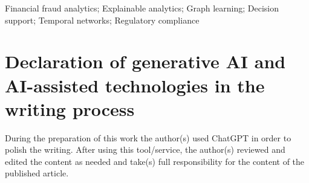 \documentclass[preprint,12pt,authoryear]{elsarticle}
\begin{document}
\begin{frontmatter}
\begin{keyword}
Financial fraud analytics; Explainable analytics; Graph learning; Decision support; Temporal networks; Regulatory compliance
\end{keyword}




\end{frontmatter}









\section{Declaration of generative AI and AI-assisted technologies in the writing process}

During the preparation of this work the author(s) used ChatGPT in order to polish the writing. After using this tool/service, the author(s) reviewed and edited the content as needed and take(s) full responsibility for the content of the published article.



%  


\end{document}
